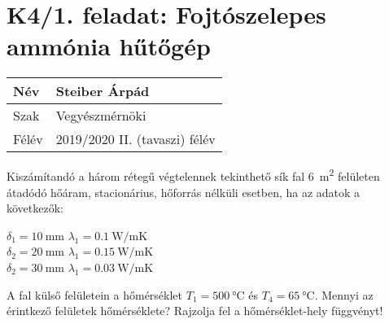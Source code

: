

\section*{K4/1. feladat: Fojtószelepes ammónia hűtőgép}

\begin{tabular}{ | p{2cm} | p{14cm} | } 
	\hline
	Név & Steiber Árpád \\ 
	\hline
	Szak & Vegyészmérnöki \\ 
	\hline
	Félév & 2019/2020 II. (tavaszi) félév \\ 
	\hline
\end{tabular}
\vspace{0.5cm}

\noindent Kiszámítandó a három rétegű végtelennek tekinthető sík fal \SI{6}{\meter\squared} felületen átadódó hőáram, stacionárius, hőforrás nélküli esetben, ha az adatok a következők:
\begin{center}
	$\delta_1 = \SI{10}{\milli\meter}$ $\lambda_1 = \SI{0.1}{\watt\per\meter\kelvin}$ \\
	\vspace{2mm}
	$\delta_2 = \SI{20}{\milli\meter}$ $\lambda_1 = \SI{0.15}{\watt\per\meter\kelvin}$ \\
	\vspace{2mm}
	$\delta_2 = \SI{30}{\milli\meter}$ $\lambda_1 = \SI{0.03}{\watt\per\meter\kelvin}$ \\
\end{center}

\vspace{2mm}

A fal külső felületein a hőmérséklet $T_1 = \SI{500}{\celsius}$ és $T_4 = \SI{65}{\celsius}$. Mennyi az érintkező felületek hőmérséklete? Rajzolja fel a hőmérséklet-hely függvényt!

\vspace{2mm}

